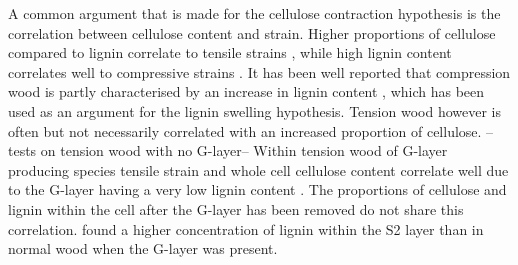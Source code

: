 A common argument that is made for the cellulose contraction hypothesis is the
correlation between cellulose content and strain. Higher proportions of
cellulose compared to lignin correlate to tensile strains \citep{Sugiyama_1993,Qiu_2008,Yang_2006}, while high lignin
content correlates well to compressive strains \citep{ISI:A1991FD97000001,Okuyama_1998}. It has been well
reported that compression wood is partly characterised by an increase in
lignin content \citep{timell1986compression}, which has been used as an argument for the lignin
swelling hypothesis. Tension wood however is often but not necessarily
correlated with an increased proportion of cellulose. --tests on tension wood
with no G-layer-- Within tension wood of G-layer producing species tensile
strain and whole cell cellulose content correlate well due to the G-layer
having a very low lignin content \citep{gardiner2014biology}. The proportions of cellulose and lignin
within the cell after the G-layer has been removed do not share this correlation. \citet{timell1969chemical} found a higher concentration of lignin within the S2 layer than in normal wood when the G-layer was present. 
